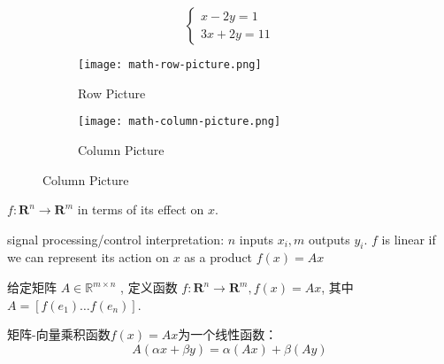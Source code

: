 \begin{example}
    \label{exm: row-column-picture}
    \begin{equation}\left\{\begin{matrix} 
        
        x - 2y=1 \\  
        3x+2y=11 
      \end{matrix}\right. \end{equation}




   
\begin{figure}[htbp]
        \caption{Row Picture and Column Picture for \ref{exm: row-column-picture}}
    \begin{subfigure}[b]{0.8\textwidth}
        \centering
        \caption{Row Picture}
    \texttt{[image: math-row-picture.png]}
    \end{subfigure}

   
    \begin{subfigure}[b]{0.8\textwidth}
        \centering
        \caption{Column Picture}
    \texttt{[image: math-column-picture.png]}
    \end{subfigure}
\end{figure}
\end{example}

$ f: \mathbf{R}^{n} \rightarrow \mathbf{R}^{m} $ in terms of its effect on $ x $. 

signal processing/control interpretation: $ n $ inputs $ x_{i}, m $ outputs $ y_{i} $. $ f $ is linear if we can represent its action on $ x $ as a product $ f(x)=A x $

\begin{definition}[矩阵-向量乘积函数 $f(x)=A x$]
    给定矩阵 $ A \in \mathbb{R}^{m \times n} $ , 定义函数 $ f: \mathbf{R}^{n} \rightarrow \mathbf{R}^{m}, f(x)=A x $, 其中 $ A=\left[f\left(e_{1}\right) \ldots f\left(e_{n}\right)\right] $.
    
\end{definition}

\begin{theorem}
    矩阵-向量乘积函数$f(x)=A x$为一个线性函数： \begin{equation} A(\alpha x+\beta y)=\alpha(A x)+\beta(A y) \end{equation}
\end{theorem}

